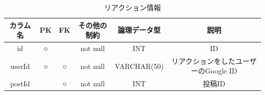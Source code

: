 \begin{table}[H]
    \centering
    \caption{リアクション情報}
    \label{tb:reaction}
    \begin{tabular}{|c|c|c|c|c|c|} \hline
        カラム名 & PK & FK & その他の制約 & 論理データ型 & 説明 \\ \hline\hline
        id & ○ & & not null & INT & ID \\ \hline
        userId & ○ & ○ & not null & VARCHAR(50) & リアクションをしたユーザーのGoogle ID \\ \hline
        postId & & ○ & not null & INT & 投稿ID \\ \hline
    \end{tabular}
\end{table}